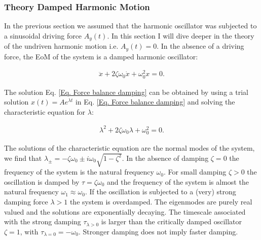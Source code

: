 \documentclass{article}
\begin{document}
\subsubsection{Theory Damped Harmonic Motion}
In the previous section we assumed that the harmonic oscillator was subjected to a sinusoidal driving force $A_y(t)$. In this section I will dive deeper in the theory of the undriven harmonic motion i.e. $A_y(t) = 0$. In the absence of a driving force, the EoM of the system is a damped harmonic oscillator:

\begin{align}
    \ddot{x} + 2\zeta\omega_0\dot{x} +\omega_0^2x = 0.
    \label{Eq. Force balance damping}
\end{align}

The solution Eq. \ref{Eq. Force balance damping} can be obtained by using a trial solution $x(t) = Ae^{\lambda t}$ in Eq. \ref{Eq. Force balance damping} and solving the characteristic equation for $\lambda$:

\begin{align}
    \lambda^2 + 2\zeta\omega_0\lambda + \omega_0^2 = 0.
\end{align}

The solutions of the characteristic equation are the normal modes of the system, we find that $\lambda_{\pm} = -\zeta\omega_0 \pm i\omega_0\sqrt{1-\zeta^2}$. In the absence of damping $\zeta = 0$ the frequency of the system is the natural frequency $\omega_0$. For small damping $\zeta>0$ the oscillation is damped by $\tau = \zeta \omega_0$ and the frequency of the system is almost the natural frequency $\omega_1 \approx \omega_0$. If the oscillation is subjected to a (very) strong damping force $\lambda > 1$ the system is overdamped. The eigenmodes are purely real valued and the solutions are exponentially decaying. The timescale associated with the strong damping $\tau_{\lambda>0}$ is larger than the critically damped oscillator $\zeta =1$, with $\tau_{\lambda=0} = -\omega_0$. Stronger damping does not imply faster damping.
\end{document}
